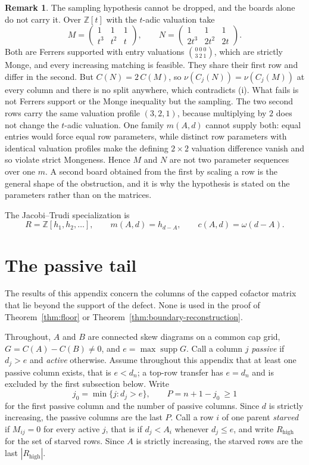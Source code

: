 \documentclass[11pt,a4paper]{amsart}
\numberwithin{equation}{section}
\theoremstyle{plain}
\theoremstyle{definition}
\newtheorem{remark}[theorem]{Remark}
\DeclareMathOperator{\supp}{supp}
\newcommand{\Z}{\mathbb Z}
\begin{document}
\begin{remark}\label{rem:abstract-family}
The sampling hypothesis cannot be dropped, and the boards alone do not carry it.
Over \(\Z[t]\) with the \(t\)-adic valuation take
\[
M=\begin{pmatrix}1&1&1\\ t^3&t^2&t\end{pmatrix},
\qquad
N=\begin{pmatrix}1&1&1\\ 2t^3&2t^2&2t\end{pmatrix}.
\]
Both are Ferrers supported with entry valuations \(\binom{0\ 0\ 0}{3\ 2\ 1}\),
which are strictly Monge, and every increasing matching is feasible.  They share
their first row and differ in the second.  But \(C(N)=2\,C(M)\), so
\(\nu(C_j(N))=\nu(C_j(M))\) at every column and there is no split anywhere,
which contradicts (i).  What fails is not Ferrers support or the Monge
inequality but the sampling.  The two second rows carry the same valuation
profile \((3,2,1)\), because multiplying by \(2\) does not change the
\(t\)-adic valuation.  One family \(m(A,d)\) cannot supply both: equal entries
would force equal row parameters, while distinct row parameters with identical
valuation profiles make the defining \(2\times2\) valuation difference vanish
and so violate strict Mongeness.  Hence \(M\) and \(N\) are not two
parameter sequences over one \(m\).  A second board obtained from the first by
scaling a row is the general shape of the obstruction, and it is why the
hypothesis is stated on the parameters rather than on the matrices.
\end{remark}

The Jacobi--Trudi specialization is
\[
R=\Z[h_1,h_2,\ldots],
\qquad
m(A,d)=h_{d-A},
\qquad
c(A,d)=\omega(d-A).
\]

\section{The passive tail}\label{app:rank4}

The results of this appendix concern the columns of the capped cofactor matrix that lie beyond the support of the defect.  None is used in the proof of Theorem~\ref{thm:floor} or Theorem~\ref{thm:boundary-reconstruction}.

Throughout, \(A\) and \(B\) are connected skew diagrams on a common cap grid, \(G=C(A)-C(B)\ne0\), and \(e=\max\supp G\).
Call a column \(j\) \emph{passive} if \(d_j>e\) and \emph{active} otherwise.  Assume throughout this appendix that at least one passive column exists, that is \(e<d_n\); a top-row transfer has \(e=d_n\) and is excluded by the first subsection below.  Write
\[
j_0=\min\{j:d_j>e\},
\qquad
P=n+1-j_0\ \ge1
\]
for the first passive column and the number of passive columns.  Since \(d\) is strictly increasing, the passive columns are the last \(P\).  Call a row \(i\) of one parent \emph{starved} if \(M_{ij}=0\) for every active \(j\), that is if \(d_j<A_i\) whenever \(d_j\le e\), and write \(R_{\mathrm{high}}\) for the set of starved rows.  Since \(A\) is strictly increasing, the starved rows are the last \(|R_{\mathrm{high}}|\).
\end{document}

